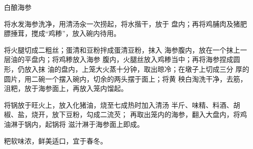 \begin{recipe}[金钱海参]{白酿海参}

\ingredients


\cooking

\step 	将水发海参洗净，用清汤汆一次捞起，将水揩干，放于 盘内；再将鸡脯肉及猪肥膘捶茸，搅成“鸡糁”，放入碗内待用。

\step 	将火腿切成二粗丝；蛋清和豆粉拌成蛋清豆粉，抹入 海参腹内，放在一个抹上一层油的平盘内；将鸡糁放入海参 腹内，火腿丝放入鸡糁当中；再将海参捏成圆形，仍放入抹 油的盘内，上笼大火蒸十分钟，取出晾冷；在墩子上切成三分 厚的圆片，用二碗一个摆入碗内，切余的两头摆于面上；将黄 秧白淘洗干净，去筋，沮粑，放于海参面上，再放入笼内馏起。

\step 	将锅放于旺火上，放入化猪油，烧至七成热时加入清汤 半斤、味精、料酒、胡椒、盐，烧开，放下豆粉，勾成二流芡； 再取出笼内的海参，翻入大盘内，将鸡油淋于锅内，起锅将 滋汁淋于海参面上即成。

\notes

粑软味浓，鲜美适口，宜于春冬。

\end{recipe}

